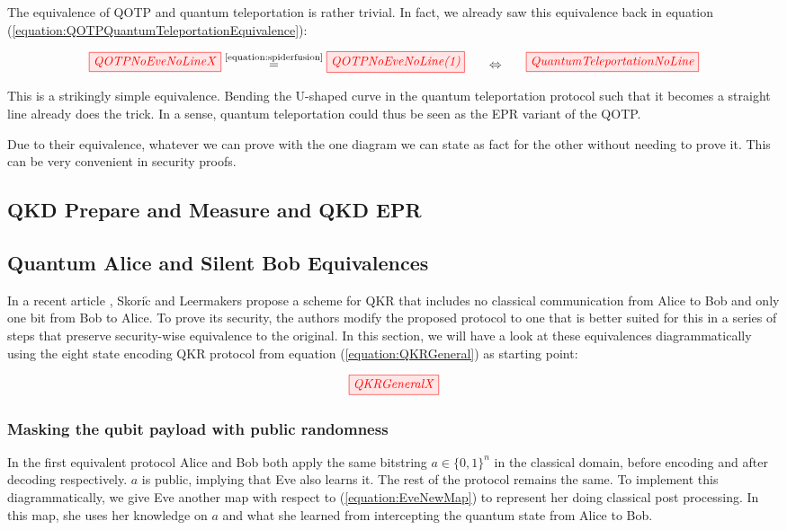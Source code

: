 \documentclass[]{article}
\newcommand{\equaltext}[1]{\ensuremath{\stackrel{\text{#1}}{=}}}
\begin{document}
The equivalence of QOTP and quantum teleportation is rather trivial. In fact, we already saw this equivalence back in equation (\ref{equation:QOTPQuantumTeleportationEquivalence}):

\begin{equation}
\tikzfig{QOTPNoEveNoLineX} \equaltext{\ref{equation:spiderfusion}} \tikzfig{QOTPNoEveNoLine(1)}~~~~~ \Leftrightarrow ~~~~~\tikzfig{QuantumTeleportationNoLine}
\end{equation}

This is a strikingly simple equivalence. Bending the U-shaped curve in the quantum teleportation protocol such that it becomes a straight line already does the trick. In a sense, quantum teleportation could thus be seen as the EPR variant of the QOTP. 

Due to their equivalence, whatever we can prove with the one diagram we can state as fact for the other without needing to prove it. This can be very convenient in security proofs.

\subsection{QKD Prepare and Measure and QKD EPR}

\subsection{Quantum Alice and Silent Bob Equivalences}

\label{section:QAaSBEequivalences}
In a recent article \cite{Leermakers2019}, Skori$\check{\textrm{c}}$ and Leermakers propose a scheme for QKR that includes no classical communication from Alice to Bob and only one bit from Bob to Alice. To prove its security, the authors modify the proposed protocol to one that is better suited for this in a series of steps that preserve security-wise equivalence to the original. In this section, we will have a look at these equivalences diagrammatically using the eight state encoding QKR protocol from equation (\ref{equation:QKRGeneral}) as starting point:

\begin{equation}
\label{equation:QKRGeneral}
	\tikzfig{QKRGeneralX}
\end{equation}


\subsubsection{Masking the qubit payload with public randomness}
\label{section:maskingqubitpubrand}
In the first equivalent protocol Alice and Bob both apply the same bitstring $a \in \{0,1\}^n$ in the classical domain, before encoding and after decoding respectively. $a$ is public, implying that Eve also learns it. The rest of the protocol remains the same. To implement this diagrammatically, we give Eve another map with respect to (\ref{equation:EveNewMap}) to represent her doing classical post processing. In this map, she uses her knowledge on $a$ and what she learned from intercepting the quantum state from Alice to Bob.
\end{document}
